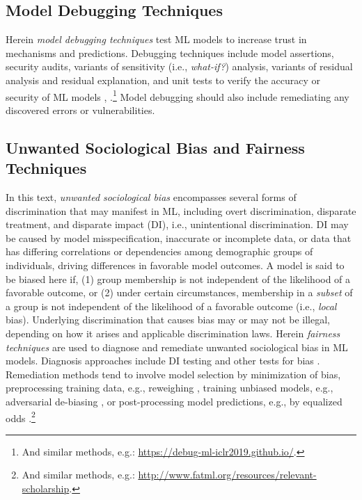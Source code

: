 \documentclass{article}
\begin{document}
\subsection{Model Debugging Techniques}

Herein \textit{model debugging techniques} test ML models to increase trust in mechanisms and predictions. Debugging techniques include model assertions, security audits, variants of sensitivity (i.e., \textit{what-if?}) analysis, variants of residual analysis and residual explanation, and unit tests to verify the accuracy or security of ML models \cite{modeltracker}, \cite{kangdebugging}.\footnote{\scriptsize{And similar methods, e.g.: \url{https://debug-ml-iclr2019.github.io/}.}} Model debugging should also include remediating any discovered errors or vulnerabilities.

\subsection{Unwanted Sociological Bias and Fairness Techniques}

In this text, \textit{unwanted sociological bias} encompasses several forms of discrimination that may manifest in ML, including overt discrimination, disparate treatment, and disparate impact (DI), i.e., unintentional discrimination. DI may be caused by model misspecification, inaccurate or incomplete data, or data that has differing correlations or dependencies among demographic groups of individuals, driving differences in favorable model outcomes. A model is said to be biased here if, (1) group membership is not independent of the likelihood of a favorable outcome, or (2) under certain circumstances, membership in a \textit{subset} of a group is not independent of the likelihood of a favorable outcome (i.e., \textit{local} bias). Underlying discrimination that causes bias may or may not be illegal, depending on how it arises and applicable discrimination laws. Herein \textit{fairness techniques} are used to diagnose and remediate unwanted sociological bias in ML models. Diagnosis approaches include DI testing and other tests for bias \cite{feldman2015certifying}. Remediation methods tend to involve model selection by minimization of bias, preprocessing training data, e.g., reweighing \cite{kamiran2012data}, training unbiased models, e.g., adversarial de-biasing \cite{zhang2018mitigating}, or post-processing model predictions, e.g., by equalized odds \cite{hardt2016equality}.\footnote{\scriptsize{And similar methods, e.g.: \url{http://www.fatml.org/resources/relevant-scholarship}.}}
\end{document}
